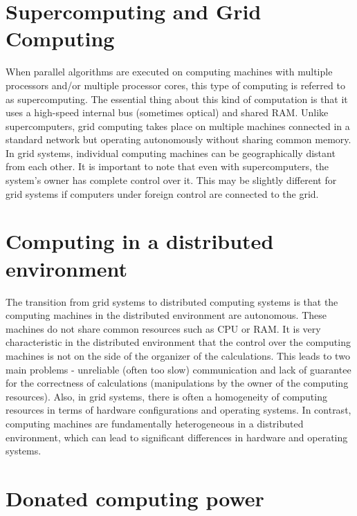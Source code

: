 \section{Supercomputing and Grid Computing}

When parallel algorithms are executed on computing machines with multiple processors and/or multiple processor cores, this type of computing is referred to as supercomputing. The essential thing about this kind of computation is that it uses a high-speed internal bus (sometimes optical) and shared RAM. Unlike supercomputers, grid computing takes place on multiple machines connected in a standard network but operating autonomously without sharing common memory. In grid systems, individual computing machines can be geographically distant from each other. It is important to note that even with supercomputers, the system's owner has complete control over it. This may be slightly different for grid systems if computers under foreign control are connected to the grid.

\section{Computing in a distributed environment}

The transition from grid systems to distributed computing systems is that the computing machines in the distributed environment are autonomous. These machines do not share common resources such as CPU or RAM. It is very characteristic in the distributed environment that the control over the computing machines is not on the side of the organizer of the calculations. This leads to two main problems - unreliable (often too slow) communication and lack of guarantee for the correctness of calculations (manipulations by the owner of the computing resources). Also, in grid systems, there is often a homogeneity of computing resources in terms of hardware configurations and operating systems. In contrast, computing machines are fundamentally heterogeneous in a distributed environment, which can lead to significant differences in hardware and operating systems.

\section{Donated computing power}

